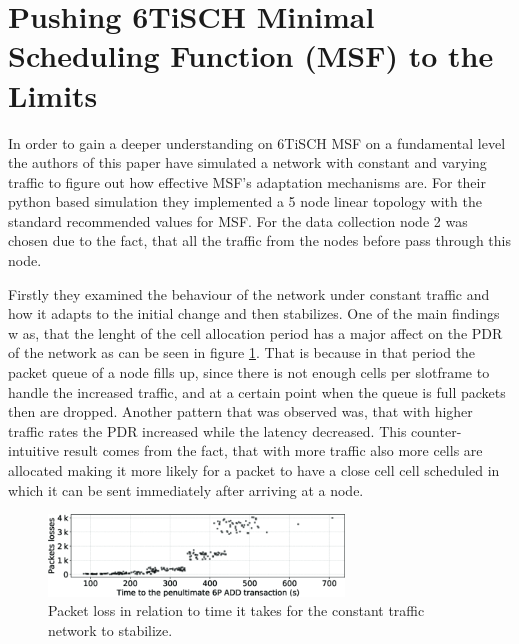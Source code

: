 \documentclass{comnets-thesis}
\begin{document}
\section{Pushing 6TiSCH Minimal Scheduling Function (MSF) to the Limits}
In order to gain a deeper understanding on 6TiSCH MSF on a fundamental level the authors of this paper \cite{PushingMSFToTheLimits} have simulated a network with constant and varying traffic to figure out how effective MSF's adaptation mechanisms are. For their python based simulation \cite{Simulating6TiSCHNetworks} they implemented a 5 node linear topology with the standard recommended values for MSF. For the data collection node 2 was chosen due to the fact, that all the traffic from the nodes before pass through this node.

Firstly they examined the behaviour of the network under constant traffic and how it adapts to the initial change and then stabilizes. One of the main findings w as, that the lenght of the cell allocation period has a major affect on the PDR of the network as can be seen in figure \ref{fig:6p-add-time-length-relation-pdr}. That is because in that period the packet queue of a node fills up, since there is not enough cells per slotframe to handle the increased traffic, and at a certain point when the queue is full packets then are dropped. Another pattern that was observed was, that with higher traffic rates the PDR increased while the latency decreased. This counter-intuitive result comes from the fact, that with more traffic also more cells are allocated making it more likely for a packet to have a close cell cell scheduled in which it can be sent immediately after arriving at a node. 
\begin{figure}
    \centering
    \includegraphics[width=0.7\textwidth]{./images/pushing 6tisch msf to the limits - 6p add length time graph.png}
    \caption{Packet loss in relation to time it takes for the constant traffic network to stabilize.}
    \label{fig:6p-add-time-length-relation-pdr}
\end{figure}
\end{document}
